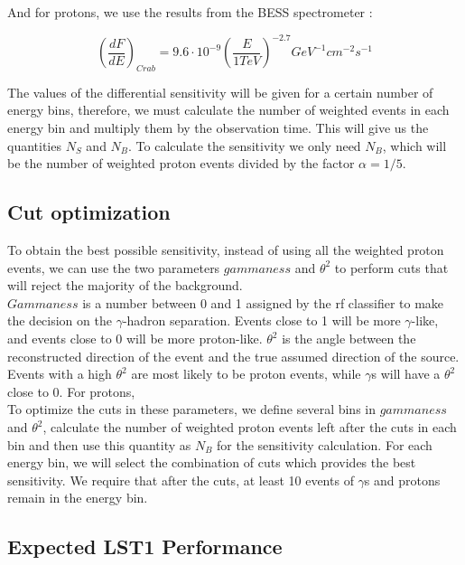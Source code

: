 \documentclass[main.tex]{subfiles}
\begin{document}
And for protons, we use the results from the BESS spectrometer \cite{2000protonBESS}:

\begin{equation}
    \left(\frac{dF}{dE}\right)_{Crab} = 9.6\cdot 10^{-9} \left(\frac{E}{1 TeV}\right)^{-2.7} GeV^{-1}cm^{-2}s^{-1}
\end{equation}

The values of the differential sensitivity will be given for a certain number of energy bins, therefore, we must calculate the number of weighted events in each energy bin and multiply them by the observation time. This will give us the quantities $N_{S}$ and $N_{B}$. To calculate the sensitivity we only need $N_{B}$, which will be the number of weighted proton events divided by the factor $\alpha = 1/5$.

\subsection{Cut optimization}

To obtain the best possible sensitivity, instead of using all the weighted proton events, we can use the two parameters $gammaness$ and $\theta^2$ to perform cuts that will reject the majority of the background.\\
$Gammaness$ is a number between 0 and 1 assigned by the \gls{rf} classifier to make the decision on the $\gamma$-hadron separation. Events close to 1 will be more $\gamma$-like, and events close to 0 will be more proton-like.
$\theta^2$ is the angle between the reconstructed direction of the event and the true assumed direction of the source. Events with a high $\theta^2$ are most likely to be proton events, while $\gamma$s will have a $\theta^2$ close to 0. For protons, 
\\
To optimize the cuts in these parameters, we define several bins in $gammaness$ and $\theta^2$, calculate the number of weighted proton events left after the cuts in each bin and then use this quantity as $N_{B}$ for the sensitivity calculation. For each energy bin, we will select the combination of cuts which provides the best sensitivity. We require that after the cuts, at least 10 events of $\gamma$s and protons remain in the energy bin.  

\subsection{Expected LST1 Performance}\label{sec:performance}
\end{document}
